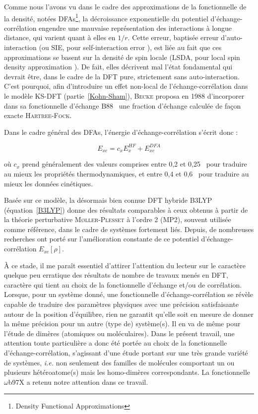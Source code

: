 \documentclass[12pt,a4paper]{book}
\begin{document}
	Comme nous l'avons vu dans le cadre des approximations de la fonctionnelle de la densité, notées DFAs\footnote{\og Density Functional Approximations \fg{} }, la décroissance exponentielle du potentiel d'échange-corrélation engendre une mauvaise représentation des interactions à longue distance, qui varient quant à elles en $1/r$. Cette erreur, baptisée erreur d'auto-interaction (ou SIE, pour \og self-interaction error \fg{}), est liée au fait que ces approximations se basent sur la densité de spin locale (LSDA, pour \og local spin density approximation \fg{}). De fait, elles décrivent mal l'état fondamental qui devrait être, dans le cadre de la DFT pure, strictement sans auto-interaction.     
	C'est pourquoi, afin d'introduire un effet non-local de l'échange-corrélation dans le modèle KS-DFT (partie~\ref{Kohn-Sham}), \textsc{Becke} proposa en 1988 d'incorporer dans sa fonctionnelle d'échange B88~\cite{becke1988density} une fraction d'échange calculée de façon exacte \textsc{Hartree-Fock}. 
	
	Dans le cadre général des DFAs, l'énergie d'échange-corrélation s'écrit donc :
	
	\begin{equation}
	E_{xc} = c_{x}E_{x}^{HF} + E_{xc}^{DFA}
	\label{xcB88}
	\end{equation}
	
	\noindent où $c_{x}$ prend généralement des valeurs comprises entre 0,2 et 0,25~\cite{becke1993density} pour traduire au mieux les propriétés thermodynamiques, et entre 0,4 et 0,6~\cite{boese2004development} pour traduire au mieux les données cinétiques.
	
	Basée sur ce modèle, la désormais bien connue DFT hybride B3LYP \cite{becke1993density} (équation~\ref{B3LYP}) donne des résultats comparables à ceux obtenus à partir de la théorie perturbative \textsc{M\o ller-Plesset} à l'ordre 2 \cite{moller1934note} (MP2), souvent utilisée comme référence, dans le cadre de systèmes fortement liés. Depuis, de nombreuses recherches ont porté sur l'amélioration constante de ce potentiel d'échange-corrélation $E_{xc}[\rho]$.
	
	À ce stade, il me paraît essentiel d'attirer l’attention du lecteur sur le caractère quelque peu \og erratique \fg{} des résultats de nombre de travaux menés en DFT, caractère qui tient au choix de la fonctionnelle d'échange et/ou de corrélation. 
	 Lorsque, pour un système donné, une fonctionnelle d’échange-corrélation se révèle capable de traduire des paramètres physiques avec une précision satisfaisante autour de la position d’équilibre, rien ne garantit qu’elle soit en mesure de donner la même précision pour un autre (type de) système(s). Il en va de même pour l’étude de dimères (atomiques ou moléculaires). Dans le présent travail, une attention toute particulière a donc été portée au choix de la fonctionnelle d’échange-corrélation, s'agissant d'une étude portant sur une très grande variété de systèmes, \textit{i.e.} non seulement des familles de molécules comportant un ou plusieurs hétéroatome(s) mais les homo-dimères correspondants. La fonctionnelle $\omega$b97X a retenu notre attention dans ce travail.
	
\end{document}
